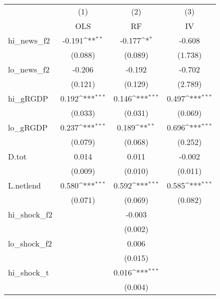 {
\def\sym#1{\ifmmode^{#1}\else\(^{#1}\)\fi}
\begin{tabular}{l*{3}{c}}
\toprule
            &\multicolumn{1}{c}{(1)}&\multicolumn{1}{c}{(2)}&\multicolumn{1}{c}{(3)}\\
            &\multicolumn{1}{c}{OLS}&\multicolumn{1}{c}{RF}&\multicolumn{1}{c}{IV}\\
\midrule
hi\_news\_f2  &      -0.191\sym{**} &      -0.177\sym{*}  &      -0.608         \\
            &     (0.088)         &     (0.089)         &     (1.738)         \\
\addlinespace
lo\_news\_f2  &      -0.206         &      -0.192         &      -0.702         \\
            &     (0.121)         &     (0.129)         &     (2.789)         \\
\addlinespace
hi\_gRGDP    &       0.192\sym{***}&       0.146\sym{***}&       0.497\sym{***}\\
            &     (0.033)         &     (0.031)         &     (0.069)         \\
\addlinespace
lo\_gRGDP    &       0.237\sym{***}&       0.189\sym{**} &       0.696\sym{***}\\
            &     (0.079)         &     (0.068)         &     (0.252)         \\
\addlinespace
D.tot       &       0.014         &       0.011         &      -0.002         \\
            &     (0.009)         &     (0.010)         &     (0.011)         \\
\addlinespace
L.netlend   &       0.580\sym{***}&       0.592\sym{***}&       0.585\sym{***}\\
            &     (0.071)         &     (0.069)         &     (0.082)         \\
\addlinespace
hi\_shock\_f2 &                     &      -0.003         &                     \\
            &                     &     (0.002)         &                     \\
\addlinespace
lo\_shock\_f2 &                     &       0.006         &                     \\
            &                     &     (0.015)         &                     \\
\addlinespace
hi\_shock\_t  &                     &       0.016\sym{***}&                     \\
            &                     &     (0.004)         &                     \\

\end{tabular}}
